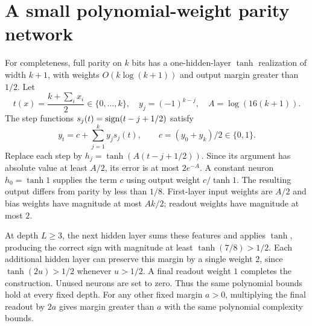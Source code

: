 \section{A small polynomial-weight parity network}\label{sec:paritycircuit}
For completeness, full parity on $k$ bits has a one-hidden-layer
$\tanh$ realization of width $k+1$, with weights $O(k\log(k+1))$
and output margin greater than $1/2$. Let
\[
 t(x)=\frac{k+\sum_i x_i}{2}\in\{0,\ldots,k\},\quad
 y_j=(-1)^{k-j},\quad A=\log(16(k+1)).
\]
The step functions $s_j(t)=\operatorname{sign}(t-j+1/2)$ satisfy
\[
 y_t=c+\sum_{j=1}^k y_js_j(t),\qquad c=(y_0+y_k)/2\in\{0,1\}.
\]
Replace each step by $h_j=\tanh(A(t-j+1/2))$. Since its argument
has absolute value at least $A/2$, its error is at most $2e^{-A}$.
A constant neuron $h_0=\tanh1$ supplies the term $c$ using output
weight $c/\tanh1$. The resulting output differs from parity by
less than $1/8$. First-layer input weights are $A/2$ and bias
weights have magnitude at most $Ak/2$; readout weights have
magnitude at most $2$.

At depth $L\ge3$, the next hidden layer sums these features and
applies $\tanh$, producing the correct sign with magnitude at least
$\tanh(7/8)>1/2$. Each additional hidden layer can preserve this
margin by a single weight $2$, since $\tanh(2u)>1/2$ whenever
$u>1/2$. A final readout weight $1$ completes the construction.
Unused neurons are set to zero. Thus the same polynomial bounds
hold at every fixed depth.
For any other fixed margin $a>0$, multiplying the final readout by $2a$
gives margin greater than $a$ with the same polynomial complexity bounds.

